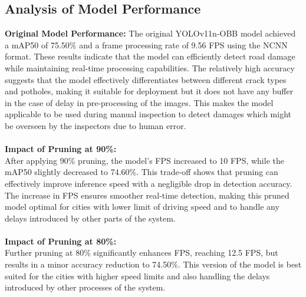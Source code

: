 \subsection{Analysis of Model Performance}
\vspace{1cm}
\textbf{Original Model Performance:}
The original YOLOv11n-OBB model achieved a mAP50 of 75.50\% and a frame processing rate of 9.56 FPS using the NCNN format. These results indicate that the model can efficiently detect road damage while maintaining real-time processing capabilities. The relatively high accuracy suggests that the model effectively differentiates between different crack types and potholes, making it suitable for deployment but it does not have any buffer in the case of delay in pre-processing of the images. This makes the model applicable to be used during manual inspection to detect damages which might be overseen by the inspectors due to human error.\\\\
\noindent\textbf{Impact of Pruning at 90\%:}\\
After applying 90\% pruning, the model's FPS increased to 10 FPS, while the mAP50 slightly decreased to 74.60\%. This trade-off shows that pruning can effectively improve inference speed with a negligible drop in detection accuracy. The increase in FPS ensures smoother real-time detection, making this pruned model optimal for cities with lower limit of driving speed and to handle any delays introduced by other parts of the system.\\\\

\noindent\textbf{Impact of Pruning at 80\%:}\\
Further pruning at 80\% significantly enhances FPS, reaching 12.5 FPS, but results in a minor accuracy reduction to 74.50\%. This version of the model is best suited for the cities with higher speed limits and also handling the delays introduced by other processes of the system.